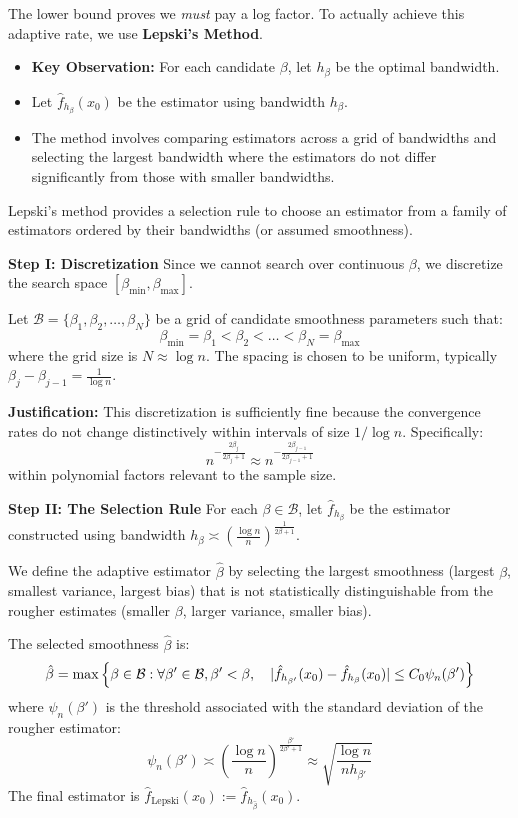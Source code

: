 The lower bound proves we \textit{must} pay a log factor. To actually achieve this adaptive rate, we use \textbf{Lepski's Method}.
\begin{itemize}
    \item \textbf{Key Observation:} For each candidate $\beta$, let $h_\beta$ be the optimal bandwidth.
    \item Let $\hat{f}_{h_\beta}(x_0)$ be the estimator using bandwidth $h_\beta$.
    \item The method involves comparing estimators across a grid of bandwidths and selecting the largest bandwidth where the estimators do not differ significantly from those with smaller bandwidths.
\end{itemize}

Lepski's method provides a selection rule to choose an estimator from a family of estimators ordered by their bandwidths (or assumed smoothness).

\textbf{Step I: Discretization}
Since we cannot search over continuous $\beta$, we discretize the search space $[\beta_{\min}, \beta_{\max}]$.

\begin{de}
Let $\mathcal{B} = \{ \beta_1, \beta_2, \dots, \beta_N \}$ be a grid of candidate smoothness parameters such that:
\[
\beta_{\min} = \beta_1 < \beta_2 < \dots < \beta_N = \beta_{\max}
\]
where the grid size is $N \approx \log n$. The spacing is chosen to be uniform, typically $\beta_j - \beta_{j-1} = \frac{1}{\log n}$.
\end{de}

\noindent \textbf{Justification:} This discretization is sufficiently fine because the convergence rates do not change distinctively within intervals of size $1/\log n$. Specifically:
\[
n^{-\frac{2\beta_j}{2\beta_j+1}} \approx n^{-\frac{2\beta_{j-1}}{2\beta_{j-1}+1}}
\]
within polynomial factors relevant to the sample size.

\noindent \textbf{Step II: The Selection Rule}
For each $\beta \in \mathcal{B}$, let $\hat{f}_{h_\beta}$ be the estimator constructed using bandwidth $h_\beta \asymp (\frac{\log n}{n})^{\frac{1}{2\beta+1}}$.

We define the adaptive estimator $\hat{\beta}$ by selecting the largest smoothness (largest $\beta$, smallest variance, largest bias) that is not statistically distinguishable from the rougher estimates (smaller $\beta$, larger variance, smaller bias).

\begin{de}
The selected smoothness $\hat{\beta}$ is:
\[
\hat{\beta} = \max \left\{ \beta \in \mathcal{B} : \forall \beta' \in \mathcal{B}, \beta' < \beta, \quad \lvert\hat{f}_{h_{\beta'}}(x_0) - \hat{f}_{h_\beta}(x_0)\rvert \leq C_0 \psi_{n}(\beta') \right\}
\]
where $\psi_{n}(\beta')$ is the threshold associated with the standard deviation of the rougher estimator:
\[
\psi_{n}(\beta') \asymp \left( \frac{\log n}{n} \right)^{\frac{\beta'}{2\beta'+1}} \approx \sqrt{\frac{\log n}{n h_{\beta'}}}
\]
The final estimator is $\hat{f}_{\text{Lepski}}(x_0) := \hat{f}_{h_{\hat{\beta}}}(x_0)$.
\end{de}

